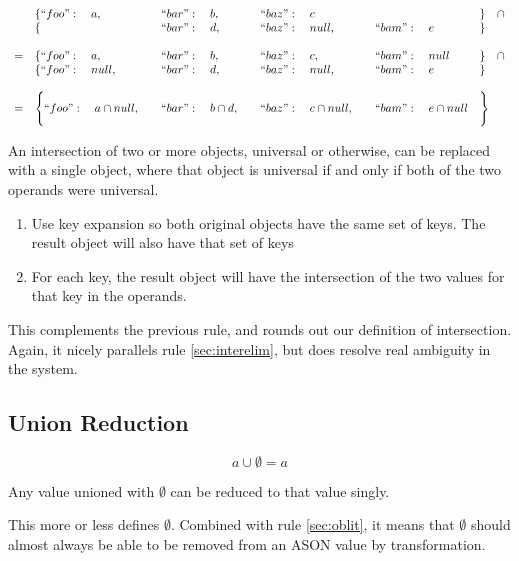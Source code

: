 \documentclass[letterpaper]{article}
\begin{document}
\begin{prule}
\label{sec:interobj}
\begin{equation}
\begin{array}{rlllll}
& \{``foo":\quad a,\quad&``bar":\quad b,\quad&``baz":\quad c&&\}\quad\cap\\
& \{&``bar":\quad d,\quad&``baz":\quad null,\quad&``bam":\quad e&\} \\
\\
=&\{``foo":\quad a,\quad&``bar":\quad b,\quad&``baz":\quad c,\quad&``bam":\quad null&\}\quad\cap\\
 &\{``foo":\quad null,\quad&``bar":\quad d,\quad&``baz":\quad null,\quad&``bam":\quad e&\} \\
\\
=&\Bigg\{``foo":\quad a\cap null,\quad&``bar":\quad b\cap
d,\quad&``baz":\quad c\cap null,\quad&``bam":\quad e\cap null&\Bigg\}\\
\end{array}
\end{equation}

An intersection of two or more objects, universal or otherwise, can be replaced
with a single object, where that object is universal if and only if both of
the two operands were universal.
\begin{enumerate}
\item Use key expansion so both original objects have the same set of keys. The
result object will also have that set of keys
\item For each key, the result object will have the intersection of the two
values for that key in the operands.
\end{enumerate}
\end{prule}

This complements the previous rule, and rounds out our definition of
intersection. Again, it nicely parallels rule \ref{sec:interelim}, but does
resolve real ambiguity in the system.

\subsection{Union Reduction}
\begin{prule}
\begin{equation}
a\cup\emptyset = a
\end{equation}

Any value unioned with \(\emptyset\) can be reduced to that value singly.
\end{prule}

This more or less defines \(\emptyset\). Combined with rule \ref{sec:oblit}, it means
that \(\emptyset\) should almost always be able to be removed from an ASON
value by transformation.
\end{document}

